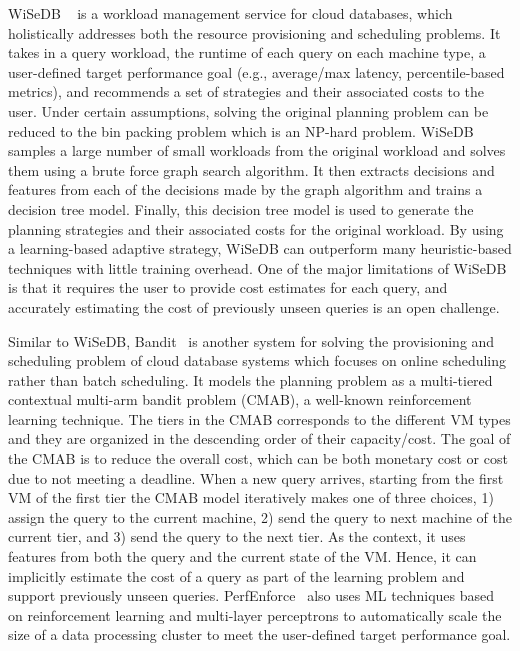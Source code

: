 WiSeDB ~\cite{wisedb} is a workload management service for cloud databases, which holistically addresses both the resource provisioning and scheduling problems.
It takes in a query workload, the runtime of each query on each machine type, a user-defined target performance goal (e.g., average/max latency, percentile-based metrics), and recommends a set of strategies and their associated costs to the user.
Under certain assumptions, solving the original planning problem can be reduced to the bin packing problem which is an NP-hard problem.
WiSeDB samples a large number of small workloads from the original workload and solves them using a brute force graph search algorithm.
It then extracts decisions and features from each of the decisions made by the graph algorithm and trains a decision tree model.
Finally, this decision tree model is used to generate the planning strategies and their associated costs for the original workload.
By using a learning-based adaptive strategy, WiSeDB can outperform many heuristic-based techniques with little training overhead.
One of the major limitations of WiSeDB is that it requires the user to provide cost estimates for each query, and accurately estimating the cost of previously unseen queries is an open challenge.


Similar to WiSeDB, Bandit~\cite{bandit} is another system for solving the provisioning and scheduling problem of cloud database systems which focuses on online scheduling rather than batch scheduling.
It models the planning problem as a multi-tiered contextual multi-arm bandit problem (CMAB), a well-known reinforcement learning technique.
The tiers in the CMAB corresponds to the different VM types and they are organized in the descending order of their capacity/cost. 
The goal of the CMAB is to reduce the overall cost, which can be both monetary cost or cost due to not meeting a deadline.
When a new query arrives, starting from the first VM of the first tier the CMAB model iteratively makes one of three choices, 1) assign the query to the current machine, 2) send the query to next machine of the current tier, and 3) send the query to the next tier.
As the context, it uses features from both the query and the current state of the VM. Hence, it can implicitly estimate the cost of a query as part of the learning problem and support previously unseen queries.
PerfEnforce~\cite{perfenforce} also uses ML techniques based on reinforcement learning and multi-layer perceptrons to automatically scale the size of a data processing cluster to meet the user-defined target performance goal.

